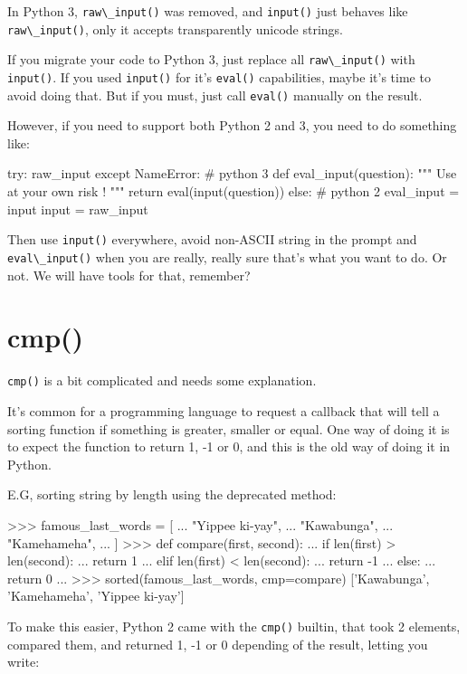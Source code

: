 In Python 3, \lstinline{raw\_input()} was removed, and \lstinline{input()} just behaves like \lstinline{raw\_input()}, only it accepts transparently unicode strings.

If you migrate your code to Python 3, just replace all \lstinline{raw\_input()} with \lstinline{input()}. If you used \lstinline{input()} for it's \lstinline{eval()} capabilities, maybe it's time to avoid doing that. But if you must, just call \lstinline{eval()} manually on the result.

However, if you need to support both Python 2 and 3, you need to do something like:

\begin{py2and3}
try:
    raw\_input
except NameError: # python 3
    def eval_input(question):
        """ Use at your own risk ! """
        return eval(input(question))
else: # python 2
    eval_input = input
    input = raw\_input
\end{py2and3}

Then use \lstinline{input()} everywhere, avoid non-ASCII string in the prompt and \lstinline{eval\_input()} when you are really, really sure that's what you want to do. Or not. We will have tools for that, remember?

\section{cmp()}

\lstinline{cmp()} is a bit complicated and needs some explanation.

It's common for a programming language to request a callback that will tell a sorting function if something is greater, smaller or equal. One way of doing it is to expect the function to return 1, -1 or 0, and this is the old way of doing it in Python.

E.G, sorting string by length using the deprecated method:

\begin{py2}
>>> famous_last_words = [
...     "Yippee ki-yay",
...     "Kawabunga",
...     "Kamehameha",
... ]
>>> def compare(first, second):
...     if len(first) > len(second):
...         return 1
...     elif len(first) < len(second):
...         return -1
...     else:
...         return 0
...
>>> sorted(famous_last_words, cmp=compare)
['Kawabunga', 'Kamehameha', 'Yippee ki-yay']
\end{py2}

To make this easier, Python 2 came with the \lstinline{cmp()} builtin, that took 2 elements, compared them, and returned 1, -1 or 0 depending of the result, letting you write:


